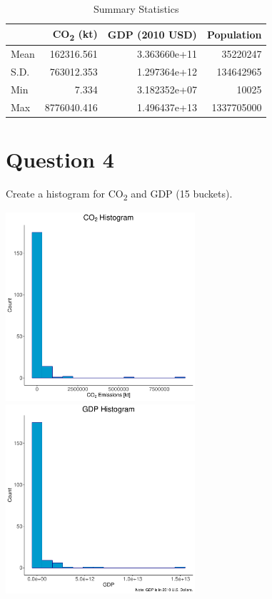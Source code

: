 \documentclass[english, 11pt]{article}\usepackage[]{graphicx}\usepackage[]{color}
\newenvironment{knitrout}{}{} %
\begin{document}
\begin{knitrout}
\color{fgcolor}\begin{table}[!h]

\caption{\label{tab:Q.3 output}Summary Statistics}
\centering
\begin{tabular}[t]{lrrr}
\toprule
  & CO\textsubscript{2} (kt) & GDP (2010 USD) & Population\\
\midrule
Mean & 162316.561 & 3.363660e+11 & 35220247\\
S.D. & 763012.353 & 1.297364e+12 & 134642965\\
Min & 7.334 & 3.182352e+07 & 10025\\
Max & 8776040.416 & 1.496437e+13 & 1337705000\\
\bottomrule
\end{tabular}
\end{table}


\end{knitrout}



\newpage
\bigskip
\noindent \section*{Question 4} Create a histogram for CO\textsubscript{2} and GDP (15 buckets).
\vspace{2mm}

\begin{knitrout}
\color{fgcolor}
\includegraphics[width=7cm,height=7cm]{figure/Q_4_output-1} 
\includegraphics[width=7cm,height=7cm]{figure/Q_4_output-2} 

\end{knitrout}
\end{document}
